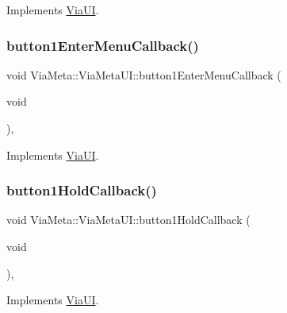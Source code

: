 Implements \mbox{\hyperlink{class_via_u_i_a0a43c527f027d11b266080d8cacb1d65}{Via\+UI}}.

\mbox{\label{class_via_meta_1_1_via_meta_u_i_a5e9d82c9c06759dd2cc3b48846e594f2}} 
\subsubsection{\texorpdfstring{button1\+Enter\+Menu\+Callback()}{button1EnterMenuCallback()}}
{\footnotesize\ttfamily void Via\+Meta\+::\+Via\+Meta\+U\+I\+::button1\+Enter\+Menu\+Callback (\begin{DoxyParamCaption}\item[{void}]{ }\end{DoxyParamCaption})\hspace{0.3cm}{\ttfamily [override]}, {\ttfamily [virtual]}}



Implements \mbox{\hyperlink{class_via_u_i_ae00249c10af94437c357222328a56f82}{Via\+UI}}.

\mbox{\label{class_via_meta_1_1_via_meta_u_i_a601890a2c65f53fc575c9ef211fcfeaa}} 
\subsubsection{\texorpdfstring{button1\+Hold\+Callback()}{button1HoldCallback()}}
{\footnotesize\ttfamily void Via\+Meta\+::\+Via\+Meta\+U\+I\+::button1\+Hold\+Callback (\begin{DoxyParamCaption}\item[{void}]{ }\end{DoxyParamCaption})\hspace{0.3cm}{\ttfamily [override]}, {\ttfamily [virtual]}}



Implements \mbox{\hyperlink{class_via_u_i_a62145ce1c1b664ff0a1aadaac9386162}{Via\+UI}}.

